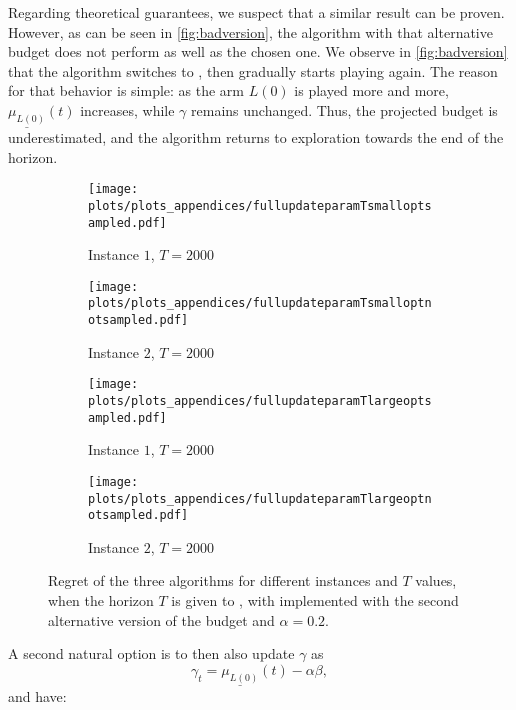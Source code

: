\begin{APPENDICES}
 Regarding theoretical guarantees, we suspect that a similar result can be proven. However, as can be seen in \cref{fig:badversion}, the algorithm with that alternative budget does not perform as well as the chosen one. We observe in \cref{fig:badversion} that the algorithm switches to \alglcb, then gradually starts playing \algucb again. The reason for that behavior is simple: as the arm $L(0)$ is played more and more, $\underline{\mu_{L(0)}}(t)$ increases, while $\gamma$ remains unchanged. Thus, the projected budget is underestimated, and the algorithm returns to exploration towards the end of the horizon.
\begin{figure}[htb]
\begin{centering}
\begin{subfigure}{.48\textwidth}
  \centering
  \texttt{[image: plots/plots\_appendices/fullupdateparamTsmalloptsampled.pdf]}
  \caption{Instance $1$, $T=2000$}
\end{subfigure}%
\begin{subfigure}{.48\textwidth}
  \centering
  \texttt{[image: plots/plots\_appendices/fullupdateparamTsmalloptnotsampled.pdf]}
  \caption{Instance $2$, $T=2000$}
\end{subfigure}
\begin{subfigure}{.48\textwidth}
  \centering
  \texttt{[image: plots/plots\_appendices/fullupdateparamTlargeoptsampled.pdf]}
  \caption{Instance $1$, $T=2000$}
\end{subfigure}%
\begin{subfigure}{.48\textwidth}
  \centering
  \texttt{[image: plots/plots\_appendices/fullupdateparamTlargeoptnotsampled.pdf]}
  \caption{Instance $2$, $T=2000$}
\end{subfigure}
\caption{Regret of the three algorithms for different instances and $T$ values, when the horizon $T$ is given to \algoname, with \algoname implemented with the second alternative version of the budget and $\alpha=0.2$.}
\label{fig:fullupdateparam}
\end{centering}
\end{figure}


A second natural option is to then also update $\gamma$ as 
\[
\gamma_t= \underline{\mu_{L(0)}}(t)-\alpha\beta,
\]
 and have:


\end{APPENDICES}
